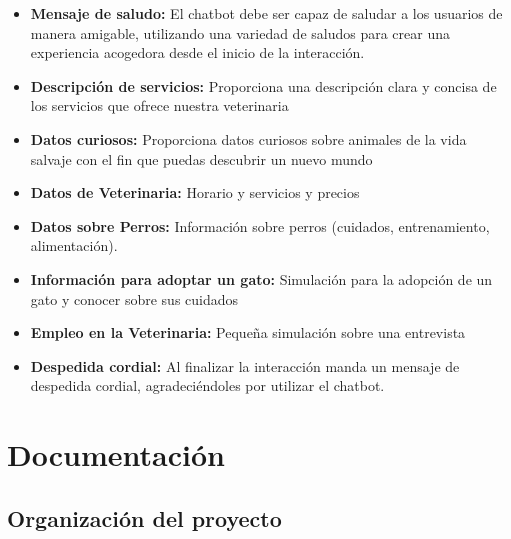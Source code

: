 \documentclass[a4paper,12pt]{article}
\begin{document}
\begin{itemize}
    \item \textbf{Mensaje de saludo:} El chatbot debe ser capaz de saludar a los usuarios de manera amigable, utilizando una variedad de saludos para crear una experiencia acogedora desde el inicio de la interacción.
    
    \item \textbf{Descripción de servicios:} Proporciona una descripción clara y concisa de los servicios que ofrece nuestra veterinaria

    \item \textbf{Datos curiosos:} Proporciona datos curiosos sobre animales de la vida salvaje con el fin que puedas descubrir un nuevo mundo 
   
    \item  \textbf{Datos de Veterinaria:} Horario y servicios y precios

    \item  \textbf{Datos sobre Perros:} Información sobre perros (cuidados, entrenamiento, alimentación).
    
    \item  \textbf{Información para adoptar un gato:} Simulación para la adopción de un gato y conocer sobre sus cuidados
    
    \item  \textbf{Empleo en la Veterinaria:} Pequeña simulación sobre una entrevista
    
    \item \textbf{Despedida cordial:} Al finalizar la interacción manda un mensaje de despedida cordial, agradeciéndoles por utilizar el chatbot.
\end{itemize}


\section{Documentación}

\subsection{Organización del proyecto}
\end{document}
